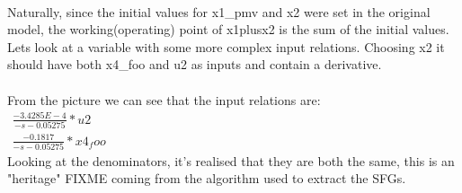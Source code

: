 \setlength\fboxsep{0pt}
\setlength\fboxrule{0.5pt}
\\\newline
Naturally, since the initial values for x1\_pmv and x2 were set in the original model, the working(operating) point of x1plusx2 is the sum of the initial values.\\\newline
Lets look at a variable with some more complex input relations. Choosing x2 it should have both x4\_foo and u2 as inputs and contain a derivative.\\\newline
\setlength\fboxsep{0pt}
\setlength\fboxrule{0.5pt}
\\\newline
From the picture we can see that the input relations are:\\
$\begin{array}{rcl} \frac{-3.4285E-4}{-s -0.05275}*u2 \end{array}$\\
$\begin{array}{rcl} \frac{-0.1817}{-s -0.05275}*x4_foo \end{array}$\\\newline
Looking at the denominators, it's realised that they are both the same, this is an "heritage" FIXME coming from the algorithm used to extract the SFGs.
